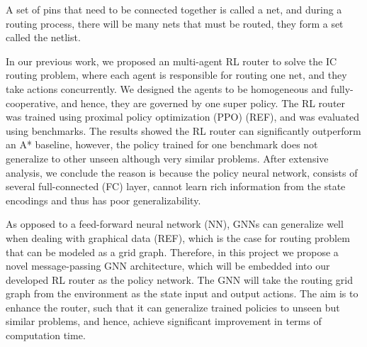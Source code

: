 \documentclass[letterpaper]{article}
\begin{document}
A set of pins that need to be connected together is called a net, and during a routing process, there will be many nets that must be routed, they form a set called the netlist.

In our previous work, we proposed an multi-agent RL router to solve the IC routing problem, where each agent is responsible for routing one net, and they take actions concurrently. We designed the agents to be homogeneous and fully-cooperative, and hence, they are governed by one super policy. The RL router was trained using proximal policy optimization (PPO) (REF), and was evaluated using benchmarks. The results showed the RL router can significantly outperform an A* baseline, however, the policy trained for one benchmark does not generalize to other unseen although very similar problems. After extensive analysis, we conclude the reason is because the policy neural network, consists of several full-connected (FC) layer, cannot learn rich information from the state encodings and thus has poor generalizability.

As opposed to a feed-forward neural network (NN), GNNs can generalize well when dealing with graphical data (REF), which is the case for routing problem that can be modeled as a grid graph. Therefore, in this project we propose a novel message-passing GNN architecture, which will be embedded into our developed RL router as the policy network. The GNN will take the routing grid graph from the environment as the state input and output actions. The aim is to enhance the router, such that it can generalize trained policies to unseen but similar problems, and hence, achieve significant improvement in terms of computation time.

 


\end{document}
